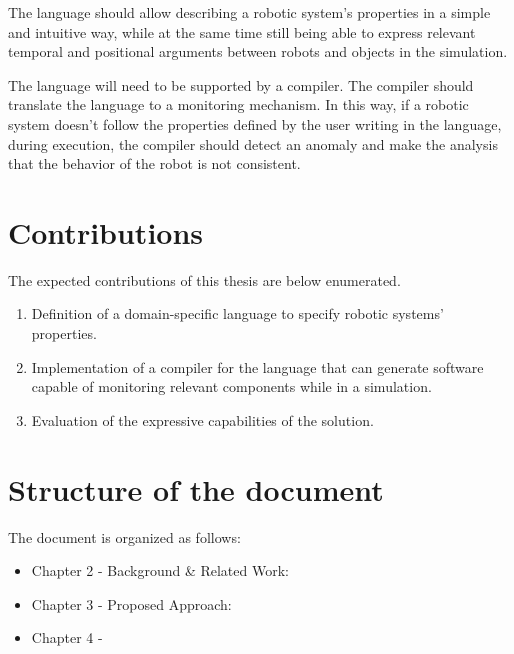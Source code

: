 The language should allow describing a robotic system's properties in a simple and intuitive way, while at the same time still being able to express relevant temporal and positional arguments between robots and objects in the simulation.

The language will need to be supported by a compiler. The compiler should translate the language to a monitoring mechanism. In this way, if a robotic system doesn't follow the properties defined by the user writing in the language, during execution, the compiler should detect an anomaly and make the analysis that the behavior of the robot is not consistent.


\section{Contributions}
\label{sec:contributions}

The expected contributions of this thesis are below enumerated.

\begin{enumerate}
    \item Definition of a domain-specific language to specify robotic systems' properties.
    \item Implementation of a compiler for the language that can generate software capable of monitoring relevant components while in a simulation.
    \item Evaluation of the expressive capabilities of the solution.
\end{enumerate}

\section{Structure of the document}
\label{sec:structure}

The document is organized as follows:

\begin{itemize}
    \item Chapter 2 - Background \& Related Work:
    \item Chapter 3 - Proposed Approach:
    \item Chapter 4 -
\end{itemize}
